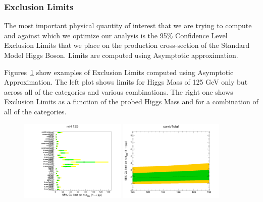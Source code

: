 \subsubsection{Exclusion Limits}
The most important physical quantity of interest that we are trying to compute and against which we optimize our analysis is the 95\% Confidence Level Exclusion Limits that we place on the production cross-section of the Standard Model Higgs Boson. Limits are computed using Asymptotic approximation.

Figures~\ref{fig:higgs_analysis_limitsexample} show examples of Exclusion Limits computed using Asymptotic Approximation. The left plot shows limits for Higgs Mass of 125 GeV only but across all of the categories and various combinations. The right one shows Exclusion Limits as a function of the probed Higgs Mass and for a combination of all of the categories.

\begin{figure}[hbp]
     \centering
     \includegraphics[width=0.45\textwidth]{figures/ch_higgs/limits/examples/limitsByMass__125__TripleGaus.png}
      \includegraphics[width=0.45\textwidth]{figures/ch_higgs/limits/examples/limitsByCategory__combTotal__TripleGaus.png}
     \caption{}
     \label{fig:higgs_analysis_limitsexample}
 \end{figure}